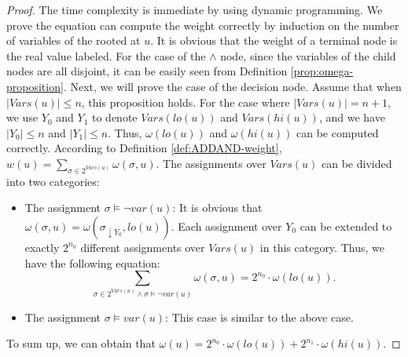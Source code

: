\begin{proposition}
		\begin{proof}
            The time complexity is immediate by using dynamic programming.
            We prove the equation can compute the weight correctly by induction on the number of variables of the \ADDAND rooted at $u$.
            It is obvious that the weight of a terminal node is the real value labeled. 
            For the case of the $\wedge$ node, since the variables of the child nodes are all disjoint, it can be easily seen from Definition \ref{prop:omega-proposition}.
            Next, we will prove the case of the decision node.
            Assume that when $|\mathit{Vars}(u)| \le n$, this proposition holds. 
            For the case where $|\mathit{Vars}(u)| = n + 1$, we use $Y_0$ and $Y_1$ to denote $\mathit{Vars}(lo(u))$ and $\mathit{Vars}(hi(u))$, and we have $|Y_0| \le n$ and $|Y_1| \le n$.
            Thus, $\mathit{\omega}(lo(u))$ and $\mathit{\omega}(hi(u))$ can be computed correctly.
            According to Definition \ref{def:ADDAND-weight}, $w(u) = \sum_{\sigma \in 2^{\mathit{Vars}(u)}}\omega(\sigma,u)$.
            The assignments over $\mathit{Vars}(u)$ can be divided into two categories: 
            \begin{itemize}
              \item The assignment $\sigma \models \lnot \mathit{var}(u)$: 
              It is obvious that $\omega(\sigma, u) = \omega(\sigma_{\downarrow Y_0}, lo(u))$. 
              Each assignment over $Y_0$ can be extended to exactly $2^{n_0}$ different assignments over $\mathit{Vars}(u)$ in this category. Thus, we have the following equation:
              $$\sum_{\sigma \in 2^{\mathit{Vars}(u)} \land \sigma \models \lnot \mathit{var}(u)}\omega(\sigma, u) = 2^{n_0} \cdot \mathit{\omega}(lo(u)).$$
              \item The assignment $\sigma \models \mathit{var}(u)$: This case is similar to the above case.
            \end{itemize}
            To sum up, we can obtain that $\mathit{\omega}(u) = 2^{n_0} \cdot \mathit{\omega}(lo(u)) + 2^{n_1} \cdot \mathit{\omega}(hi(u))$.	
		\end{proof}
		
	\end{proposition}
	
